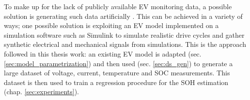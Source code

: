 To make up for the lack of publicly available EV monitoring data, a possible solution is generating such data artificially \cite{li-ion_data_where}. This can be achieved in a variety of ways; one possible solution is exploiting an EV model implemented on a simulation software such as Simulink \cite{ev_simulink_model1,ev_simulink_model2,ev_simulink_model3,ev_simulink_model4,ev_simulink_model5,racing_lounge} to simulate realistic drive cycles and gather synthetic electrical and mechanical signals from simulations. This is the approach followed in this thesis work: an existing EV model \cite{racing_lounge} is adapted (sec. \ref{sec:model_parametrization}) and then used (sec. \ref{sec:ds_gen}) to generate a large dataset of voltage, current, temperature and SOC measurements. This dataset is then used to train a regression procedure for the SOH estimation (chap. \ref{sec:experiments}).